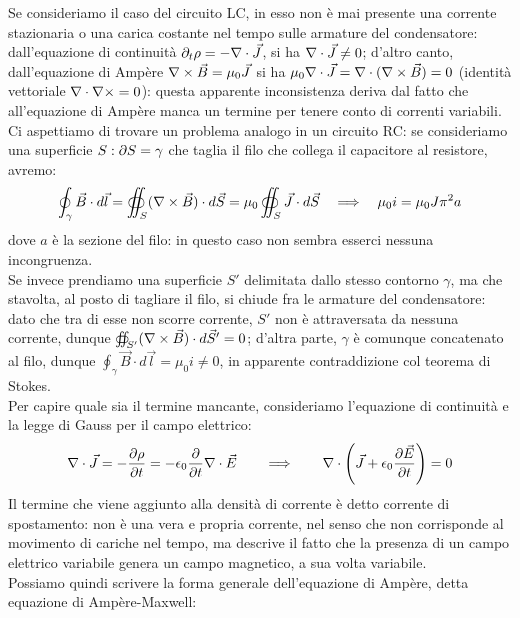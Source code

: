Se consideriamo il caso del circuito LC, in esso non è mai presente una corrente stazionaria o una carica costante nel tempo sulle armature del condensatore: dall'equazione di continuità $ \partial_t \rho = - \nabla\cdot\vec{J} $, si ha $ \nabla\cdot\vec{J} \neq 0 $; d'altro canto, dall'equazione di Ampère $ \nabla\times\vec{B} = \mu_0 \vec{J} $ si ha $ \mu_0 \nabla\cdot\vec{J} = \nabla\cdot(\nabla\times\vec{B}) = 0 $ (identità vettoriale $ \nabla\cdot\nabla\times = 0 $): questa apparente inconsistenza deriva dal fatto che all'equazione di Ampère manca un termine per tenere conto di correnti variabili. \\ 
%
Ci aspettiamo di trovare un problema analogo in un circuito RC: se consideriamo una superficie $ S : \partial S = \gamma $ che taglia il filo che collega il capacitore al resistore, avremo:
\begin{equation}
	\oint_{\gamma} \vec{B} \cdot d\vec{l} = \oiint_S (\nabla\times\vec{B}) \cdot d\vec{S} = \mu_0 \oiint_S \vec{J}\cdot d\vec{S} \quad\Longrightarrow\quad \mu_0 i = \mu_0 J \pi^2 a
	\label{eq:46}
\end{equation}
dove $ a $ è la sezione del filo: in questo caso non sembra esserci nessuna incongruenza. \\ 
%
Se invece prendiamo una superficie $ S' $ delimitata dallo stesso contorno $ \gamma $, ma che stavolta, al posto di tagliare il filo, si chiude fra le armature del condensatore: dato che tra di esse non scorre corrente, $ S' $  non è attraversata da nessuna corrente, dunque $ \oiint_{S'} (\nabla\times\vec{B}) \cdot d\vec{S}' = 0 $; d'altra parte, $ \gamma $ è comunque concatenato al filo, dunque $ \oint_{\gamma} \vec{B} \cdot d\vec{l} = \mu_0 i \neq 0 $, in apparente contraddizione col teorema di Stokes. \\ 
%
Per capire quale sia il termine mancante, consideriamo l'equazione di continuità e la legge di Gauss per il campo elettrico:
\begin{equation}
	\nabla\cdot\vec{J} = - \frac{\partial\rho}{\partial t} = - \epsilon_0 \frac{\partial}{\partial t} \nabla\cdot\vec{E} \qquad \Longrightarrow \qquad \nabla\cdot \left(\vec{J} + \epsilon_0 \frac{\partial\vec{E}}{\partial t}\right) = 0
	\label{eq:47}
\end{equation}
Il termine che viene aggiunto alla densità di corrente è detto corrente di spostamento: non è una vera e propria corrente, nel senso che non corrisponde al movimento di cariche nel tempo, ma descrive il fatto che la presenza di un campo elettrico variabile genera un campo magnetico, a sua volta variabile. \\ 
Possiamo quindi scrivere la forma generale dell'equazione di Ampère, detta equazione di Ampère-Maxwell:

